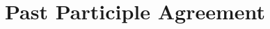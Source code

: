 \documentclass[letterpaper,10pt]{handout_nick}
\begin{document}
\begin{comment}
\end{itemize}
\item \underline{Feature-driven merge} (\citealt{adger03}; \citealt{collins03}; \citealt{lechner04}; \citealt{kobele06}; \citealt{pesetsky07}; \citealt{muller10})
\begin{itemize}
\item Unify \emph{Agree}, \emph{Internal Merge}, \emph{External Merge} as feature driven operations
\item Two types of features:
\begin{itemize}
\item Structure building, which triggers \emph{Merge}: [$\circ$ F $\circ$] 
\item Probing, which triggers \emph{Agree}: [$*$ F $*$] 
\end{itemize}
\end{itemize}
\end{enumerate}
\end{comment}

\section{Past Participle Agreement}
\end{document}
